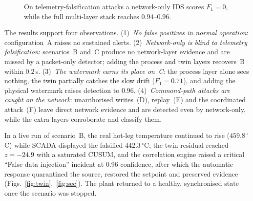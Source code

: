 \documentclass[conference]{IEEEtran}
\begin{document}
\begin{figure}[t]
\centering
{}
\caption{On telemetry-falsification attacks a network-only IDS scores $F_1=0$, while the full multi-layer stack reaches $0.94$--$0.96$.}
\label{fig:bars}
\end{figure}

The results support four observations. (1)~\emph{No false positives in normal operation}: configuration~A raises no sustained alerts. (2)~\emph{Network-only is blind to telemetry falsification}: scenarios~B and~C produce no network-layer evidence and are missed by a packet-only detector; adding the process and twin layers recovers~B within $0.2$\,s. (3)~\emph{The watermark earns its place on~C}: the process layer alone sees nothing, the twin partially catches the slow drift ($F_1=0.71$), and adding the physical watermark raises detection to $0.96$. (4)~\emph{Command-path attacks are caught on the network}: unauthorised writes~(D), replay~(E) and the coordinated attack~(F) leave direct network evidence and are detected even by network-only, while the extra layers corroborate and classify them.

In a live run of scenario~B, the real hot-leg temperature continued to rise ($459.8\,^{\circ}$C) while SCADA displayed the falsified $442.3\,^{\circ}$C; the twin residual reached $z=-24.9$ with a saturated CUSUM, and the correlation engine raised a critical ``False data injection'' incident at 0.96 confidence, after which the automatic response quarantined the source, restored the setpoint and preserved evidence (Figs.~\ref{fig:twin},~\ref{fig:sec}). The plant returned to a healthy, synchronised state once the scenario was stopped.
\end{document}
